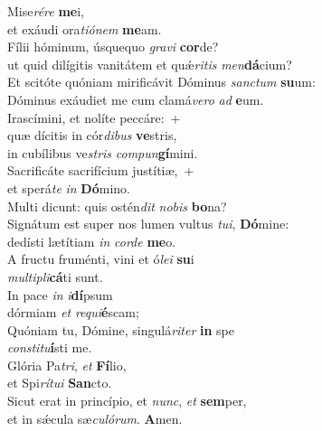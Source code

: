\evenverse Mise\textit{ré}\textit{re} \textbf{me}i,~\*\\
\evenverse et exáudi ora\textit{ti}\textit{ó}\textit{nem} \textbf{me}am.\\
\oddverse Fílii hóminum, úsquequo \textit{gra}\textit{vi} \textbf{cor}de?~\*\\
\oddverse ut quid dilígitis vanitátem et quǽ\textit{ri}\textit{tis} \textit{men}\textbf{dá}cium?\\
\evenverse Et scitóte quóniam mirificávit Dóminus \textit{san}\textit{ctum} \textbf{su}um:~\*\\
\evenverse Dóminus exáudiet me cum clamá\textit{ve}\textit{ro} \textit{ad} \textbf{e}um.\\
\oddverse Irascímini, et nolíte peccáre:~+\\
\oddverse  quæ dícitis in cór\textit{di}\textit{bus} \textbf{ve}stris,~\*\\
\oddverse in cubílibus ve\textit{stris} \textit{com}\textit{pun}\textbf{gí}mini.\\
\evenverse Sacrificáte sacrifícium justítiæ,~+\\
\evenverse  et sperá\textit{te} \textit{in} \textbf{Dó}mino.~\*\\
\evenverse Multi dicunt: quis ostén\textit{dit} \textit{no}\textit{bis} \textbf{bo}na?\\
\oddverse Signátum est super nos lumen vultus \textit{tu}\textit{i}, \textbf{Dó}mine:~\*\\
\oddverse dedísti lætítiam \textit{in} \textit{cor}\textit{de} \textbf{me}o.\\
\evenverse A fructu fruménti, vini et ó\textit{le}\textit{i} \textbf{su}i~\*\\
\evenverse \textit{mul}\textit{ti}\textit{pli}\textbf{cá}ti sunt.\\
\oddverse In pace \textit{in} \textit{i}\textbf{dí}psum~\*\\
\oddverse dórmiam \textit{et} \textit{re}\textit{qui}\textbf{é}scam;\\
\evenverse Quóniam tu, Dómine, singulá\textit{ri}\textit{ter} \textbf{in} spe~\*\\
\evenverse \textit{con}\textit{sti}\textit{tu}\textbf{í}sti me.\\
\oddverse Glória Pa\textit{tri}, \textit{et} \textbf{Fí}lio,~\*\\
\oddverse et Spi\textit{rí}\textit{tu}\textit{i} \textbf{San}cto.\\
\evenverse Sicut erat in princípio, et \textit{nunc}, \textit{et} \textbf{sem}per,~\*\\
\evenverse et in sǽcula sæ\textit{cu}\textit{ló}\textit{rum}. \textbf{A}men.\\
